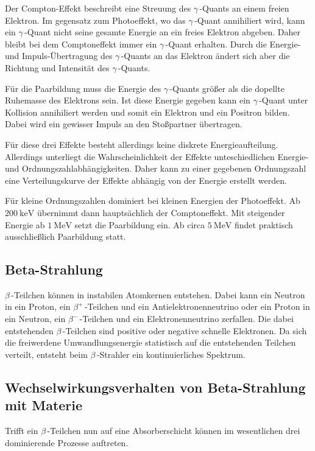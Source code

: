 Der Compton-Effekt beschreibt eine Streuung des $\gamma$\,-Quants an einem freien Elektron. Im gegensatz zum Photoeffekt, wo das $\gamma$\,-Quant annihiliert wird, kann ein 
$\gamma$\,-Quant nicht seine gesamte Energie an ein freies Elektron abgeben. Daher bleibt bei dem Comptoneffekt immer ein $\gamma$\,-Quant erhalten. Durch die Energie- und 
Impuls-Übertragung des $\gamma$\,-Quants an das Elektron ändert sich aber die Richtung und Intensität des $\gamma$\,-Quants. 

Für die Paarbildung muss die Energie des $\gamma$\,-Quants größer als die dopellte Ruhemasse des Elektrons sein. Ist diese Energie gegeben kann ein $\gamma$\,-Quant unter 
Kollision annihiliert werden und somit ein Elektron und ein Positron bilden. Dabei wird ein gewisser Impuls an den Stoßpartner übertragen.

Für diese drei Effekte besteht allerdings keine diskrete Energieaufteilung. Allerdings unterliegt die Wahrscheinlichkeit der Effekte unteschiedlichen Energie- und 
Ordnungszahlabhängigkeiten. Daher kann zu einer gegebenen Ordnungszahl eine Verteilungskurve der Effekte abhängig von der Energie erstellt werden.

Für kleine Ordnungszahlen dominiert bei kleinen Energien der Photoeffekt. Ab $\qty{200}{\kilo\electronvolt}$ übernimmt dann hauptsächlich der Comptoneffekt. Mit steigender 
Energie ab $\qty{1}{\mega\electronvolt}$ setzt die Paarbildung ein. Ab circa $\qty{5}{\mega\electronvolt}$ findet praktisch ausschließlich Paarbildung statt.

\subsection{Beta-Strahlung}
\label{subsec:Betastrahlung}
$\beta$\,-Teilchen können in instabilen Atomkernen entstehen. Dabei kann ein Neutron in ein Proton, ein $\beta^+$\,-Teilchen und ein Antielektronenneutrino oder
ein Proton in ein Neutron, ein $\beta^-$\,-Teilchen und ein Elektronenneutrino zerfallen. Die dabei entstehenden $\beta$\,-Teilchen sind positive oder negative schnelle
Elektronen. Da sich die freiwerdene Umwandlungsenergie statistisch auf die entstehenden Teilchen verteilt, entsteht beim $\beta$\,-Strahler ein kontinuierliches Spektrum.

\subsection{Wechselwirkungsverhalten von Beta-Strahlung mit Materie}
\label{BetaWechselwirkung}
Trifft ein $\beta$\,-Teilchen nun auf eine Absorberschicht können im wesentlichen drei dominierende Prozesse auftreten.


